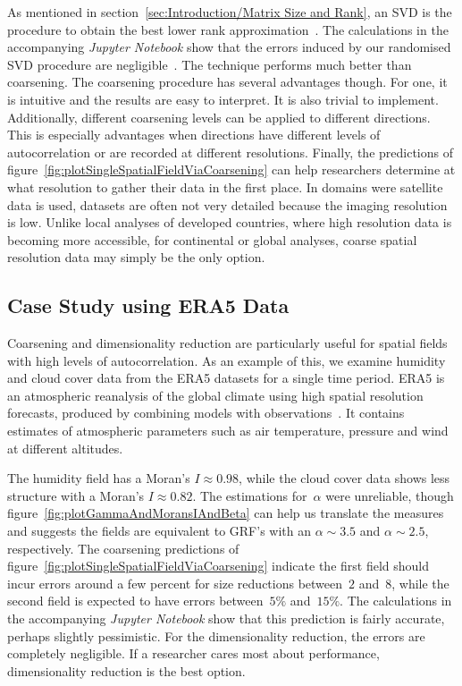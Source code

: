 \documentclass[ijgi,article,submit,moreauthors,pdftex,10pt,a4paper]{Definitions/mdpi}
\begin{document}
As mentioned in section~\ref{sec:Introduction/Matrix Size and Rank}, an SVD is the procedure to obtain the best lower rank approximation~\cite{Eckart1936, Martinsson2016}. The calculations in the accompanying \textit{Jupyter Notebook} show that the errors induced by our randomised SVD procedure are negligible~\cite{Bogaardt2018}. The technique performs much better than coarsening. The coarsening procedure has several advantages though. For one, it is intuitive and the results are easy to interpret. It is also trivial to implement. Additionally, different coarsening levels can be applied to different directions. This is especially advantages when directions have different levels of autocorrelation or are recorded at different resolutions. Finally, the predictions of figure~\ref{fig:plotSingleSpatialFieldViaCoarsening} can help researchers determine at what resolution to gather their data in the first place. In domains were satellite data is used, datasets are often not very detailed because the imaging resolution is low. Unlike local analyses of developed countries, where high resolution data is becoming more accessible, for continental or global analyses, coarse spatial resolution data may simply be the only option.

\subsection{Case Study using ERA5 Data}
\label{sec:Results/Case Study using ERA5 Data}

\enlargethispage{4mm}
Coarsening and dimensionality reduction are particularly useful for spatial fields with high levels of autocorrelation. As an example of this, we examine humidity and cloud cover data from the ERA5 datasets for a single time period. ERA5 is an atmospheric reanalysis of the global climate using high spatial resolution forecasts, produced by combining models with observations~\cite{Dee2011}. It contains estimates of atmospheric parameters such as air temperature, pressure and wind at different altitudes.

The humidity field has a Moran's $I \approx 0.98$, while the cloud cover data shows less structure with a Moran's $I \approx 0.82$. The estimations for~$\alpha$ were unreliable, though figure~\ref{fig:plotGammaAndMoransIAndBeta} can help us translate the measures and suggests the fields are equivalent to GRF's with an $\alpha \sim 3.5$ and $\alpha \sim 2.5$, respectively. The coarsening predictions of figure~\ref{fig:plotSingleSpatialFieldViaCoarsening} indicate the first field should incur errors around a few percent for size reductions between~$2$ and~$8$, while the second field is expected to have errors between~$5\%$ and~$15\%$. The calculations in the accompanying \textit{Jupyter Notebook} show that this prediction is fairly accurate, perhaps slightly pessimistic. For the dimensionality reduction, the errors are completely negligible. If a researcher cares most about performance, dimensionality reduction is the best option.
\end{document}
